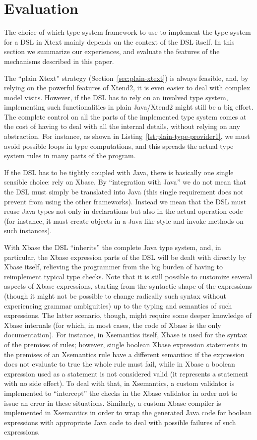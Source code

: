 \section{Evaluation}
\label{sec:evaluation}

The choice of which type system framework to use to implement the type system
for a DSL in Xtext mainly depends on the context of the DSL itself.  In this
section we summarize our experiences, and evaluate the features of the
mechanisms described in this paper.

The ``plain Xtext'' strategy (Section~\ref{sec:plain-xtext}) is always feasible,
and, by relying on the powerful features of Xtend2, it is even easier to deal
with complex model visits.  However, if the DSL has to rely on an involved type
system, implementing such functionalities in plain Java/Xtend2 might still be a
big effort.  The complete control on all the parts of the implemented type
system comes at the cost of having to deal with all the internal details,
without relying on any abstraction.  For instance, as shown in
Listing~\ref{lst:plain-type-provider1}, we must avoid possible loops in type
computations, and this spreads the actual type system rules in many parts of the
program.

If the DSL has to be tightly coupled with Java, there is basically one single
sensible choice: rely on Xbase.  By ``integration with Java'' we do not mean
that the DSL must simply be translated into Java (this single requirement does not
prevent from using the other frameworks).  Instead we mean that the DSL must
reuse Java types not only in declarations but also in the actual operation code
(for instance, it must create objects in a Java-like style and invoke methods on
such instances).

With Xbase the DSL ``inherits'' the complete Java type system, and, in
particular, the Xbase expression parts of the DSL will be dealt with directly by
Xbase itself, relieving the programmer from the big burden of having to
reimplement typical type checks.  Note that it is still possible to customize
several aspects of Xbase expressions, starting from the syntactic shape of the
expressions (though it might not be possible to change radically such syntax
without experiencing grammar ambiguities) up to the typing and semantics of such
expressions.  The latter scenario, though, might require some deeper knowledge
of Xbase internals (for which, in most cases, the code of Xbase is the only
documentation).  For instance, in Xsemantics itself, Xbase is used for the
syntax of the premises of rules; however, single boolean Xbase expression
statements in the premises of an Xsemantics rule have a different semantics: if
the expression does not evaluate to true the whole rule must fail, while in
Xbase a boolean expression used as a statement is not considered valid (it
represents a statement with no side effect).  To deal with that, in Xsemantics,
a custom validator is implemented to ``intercept'' the checks in the Xbase
validator in order not to issue an error in these situations.
Similarly, a custom Xbase compiler is implemented in Xsemantics in order to wrap
the generated Java code for boolean expressions with appropriate Java code to
deal with possible failures of such expressions.

